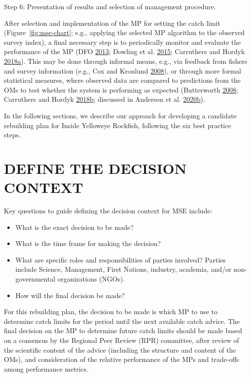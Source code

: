 \documentclass[11pt]{book}
\begin{document}
Step 6: Presentation of results and selection of management procedure.

After selection and implementation of the MP for setting the catch limit (Figure~\ref{fig:mse-chart}; e.g., applying the selected MP algorithm to the observed survey index), a final necessary step is to periodically monitor and evaluate the performance of the MP (DFO \protect\hyperlink{ref-dfo2013}{2013}; Dowling et al. \protect\hyperlink{ref-dowling2015a}{2015}; Carruthers and Hordyk \protect\hyperlink{ref-carruthers2018}{2018}\protect\hyperlink{ref-carruthers2018}{a}). This may be done through informal means, e.g., via feedback from fishers and survey information (e.g., Cox and Kronlund \protect\hyperlink{ref-cox2008a}{2008}), or through more formal statistical measures, where observed data are compared to predictions from the OMs to test whether the system is performing as expected (Butterworth \protect\hyperlink{ref-butterworth2008}{2008}; Carruthers and Hordyk \protect\hyperlink{ref-carruthers_hordyk_2018}{2018}\protect\hyperlink{ref-carruthers_hordyk_2018}{b}; discussed in Anderson et al. \protect\hyperlink{ref-anderson2020gfmp}{2020}\protect\hyperlink{ref-anderson2020gfmp}{b}).

In the following sections, we describe our approach for developing a candidate rebuilding plan for Inside Yelloweye Rockfish, following the six best practice steps.

\hypertarget{sec:decision-context}{%
\section{DEFINE THE DECISION CONTEXT}\label{sec:decision-context}}

Key questions to guide defining the decision context for MSE include:
\begin{itemize}
\item
  What is the exact decision to be made?
\item
  What is the time frame for making the decision?
\item
  What are specific roles and responsibilities of parties involved? Parties include Science, Management, First Nations, industry, academia, and/or non-governmental organizations (NGOs).
\item
  How will the final decision be made?
\end{itemize}
For this rebuilding plan, the decision to be made is which MP to use to determine catch limits for the period until the next available catch advice. The final decision on the MP to determine future catch limits should be made based on a consensus by the Regional Peer Review (RPR) committee, after review of the scientific content of the advice (including the structure and content of the OMs), and consideration of the relative performance of the MPs and trade-offs among performance metrics.
\end{document}
